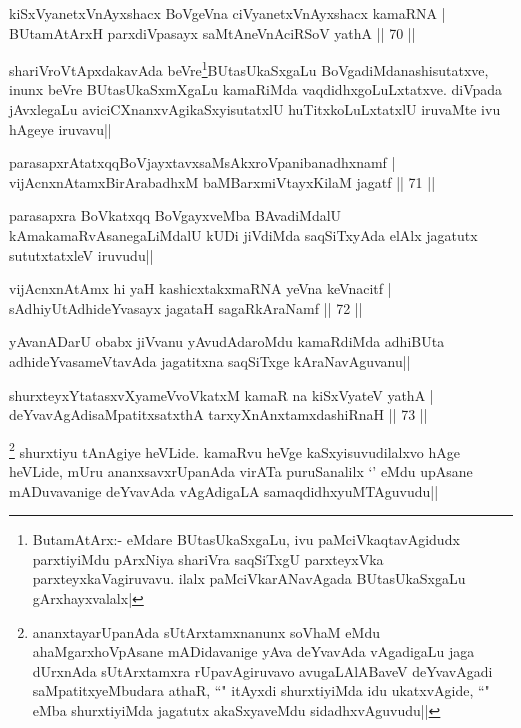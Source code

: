 \begin{shl}
kiSxVyanetxV\s nAyxshacx BoVgeVna ciVyanetxV\s nAyxshacx kamaRNA |\\
BUtamAtArxH parxdiVpasayx saMtAneVnAciRSoV yathA \hfill || 70 ||
\end{shl}

\begin{artha}
shariVroVtApxdakavAda beVre\footnote{ButamAtArx:- eMdare BUtasUkaSxgaLu, ivu paMciVkaqtavAgidudx parxtiyiMdu pArxNiya shariVra saqSiTxgU parxteyxVka parxteyxkaVagiruvavu. ilalx  paMciVkarANavAgada BUtasUkaSxgaLu gArxhayxvalalx|}BUtasUkaSxgaLu BoVgadiMdanashisutatxve, inunx beVre BUtasUkaSxmXgaLu kamaRiMda vaqdidhxgoLuLxtatxve. diVpada jAvxlegaLu aviciCXnanxvAgikaSxyisutatxlU huTitxkoLuLxtatxlU iruvaMte ivu hAgeye iruvavu||
\end{artha}

\begin{shl}
parasapxrAtatxqqBoVjayxtavxsaMsAkxroVpanibanadhxnamf |\\
vijAcnxnAtamxBirArabadhxM baMBarxmiVtayxKilaM jagatf \hfill || 71 ||
\end{shl}

\begin{artha}
parasapxra BoVkatxqq BoVgayxveMba BAvadiMdalU kAmakamaRvAsanegaLiMdalU kUDi jiVdiMda saqSiTxyAda elAlx jagatutx sututxtatxleV iruvudu||
\end{artha}


\begin{shl}
vijAcnxnAtAmx hi yaH kashicxtakxmaRNA yeVna keVnacitf |\\
sAdhiyUtAdhideYvasayx jagataH sagaRkAraNamf \hfill || 72 ||
\end{shl}

\begin{artha}
yAvanADarU obabx jiVvanu yAvudAdaroMdu kamaRdiMda adhiBUta adhideYvasameVtavAda jagatitxna saqSiTxge kAraNavAguvanu||
\end{artha}

\begin{shl}
shurxteyxYtatasxvXyameVvoVkatxM kamaR na kiSxVyateV yathA |\\
deYvavAgAdisaMpatitxsatxthA tarxyXnAnxtamxdashiRnaH \hfill || 73 ||
\end{shl}

\begin{artha}
\footnote{ananxtayarUpanAda sUtArxtamxnanunx soV\s haM eMdu ahaMgarxhoVpAsane mADidavanige yAva deYvavAda vAgadigaLu jaga dUrxnAda sUtArxtamxra rUpavAgiruvavo avugaLAlABaveV deYvavAgadi saMpatitxyeMbudara athaR, ``\stext" itAyxdi shurxtiyiMda idu ukatxvAgide, ``\stext" eMba shurxtiyiMda jagatutx akaSxyaveMdu sidadhxvAguvudu||} shurxtiyu tAnAgiye heVLide. kamaRvu heVge kaSxyisuvudilalxvo hAge heVLide, mUru ananxsavxrUpanAda virATa puruSanalilx `\stext' eMdu upAsane mADuvavanige deYvavAda vAgAdigaLA samaqdidhxyuMTAguvudu||
\end{artha}

